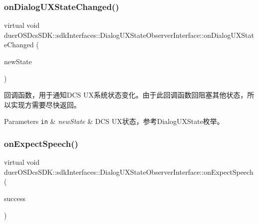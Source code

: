 \subsubsection{\texorpdfstring{on\+Dialog\+U\+X\+State\+Changed()}{onDialogUXStateChanged()}}
{\footnotesize\ttfamily virtual void duer\+O\+S\+Dcs\+S\+D\+K\+::sdk\+Interfaces\+::\+Dialog\+U\+X\+State\+Observer\+Interface\+::on\+Dialog\+U\+X\+State\+Changed (\begin{DoxyParamCaption}\item[{\hyperlink{classduerOSDcsSDK_1_1sdkInterfaces_1_1DialogUXStateObserverInterface_abbcd31d45f9112289ba73c574bf191cd}{Dialog\+U\+X\+State}}]{new\+State }\end{DoxyParamCaption})\hspace{0.3cm}{\ttfamily [pure virtual]}}



回调函数，用于通知\+D\+CS U\+X系统状态变化。由于此回调函数回阻塞其他状态，所以实现方需要尽快返回。 


\begin{DoxyParams}[1]{Parameters}
\mbox{\tt in}  & {\em new\+State} & D\+CS U\+X状态，参考\+Dialog\+U\+X\+State枚举。 \\
\hline
\end{DoxyParams}
\mbox{\label{classduerOSDcsSDK_1_1sdkInterfaces_1_1DialogUXStateObserverInterface_ad64bcd73399ce997208ff0eb438b9ca7}} 
\subsubsection{\texorpdfstring{on\+Expect\+Speech()}{onExpectSpeech()}}
{\footnotesize\ttfamily virtual void duer\+O\+S\+Dcs\+S\+D\+K\+::sdk\+Interfaces\+::\+Dialog\+U\+X\+State\+Observer\+Interface\+::on\+Expect\+Speech (\begin{DoxyParamCaption}\item[{bool}]{success }\end{DoxyParamCaption})\hspace{0.3cm}{\ttfamily [pure virtual]}}



